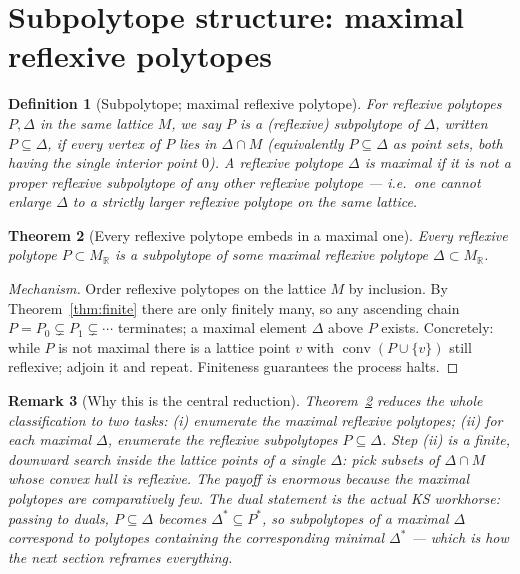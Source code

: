 \documentclass{amsart}
\newtheorem{theorem}{Theorem}[section]
\newtheorem{definition}[theorem]{Definition}
\newtheorem{remark}[theorem]{Remark}
\begin{document}
\section{Subpolytope structure: maximal reflexive polytopes}\label{sec:sub}

\begin{definition}[Subpolytope; maximal reflexive polytope]\label{def:max}
For reflexive polytopes $P,\Delta$ in the \emph{same} lattice $M$, we say
$P$ is a \emph{(reflexive) subpolytope} of $\Delta$, written $P \subseteq
\Delta$, if every vertex of $P$ lies in $\Delta \cap M$ (equivalently
$P \subseteq \Delta$ as point sets, both having the single interior point
$0$). A reflexive polytope $\Delta$ is \emph{maximal} if it is not a proper
reflexive subpolytope of any other reflexive polytope --- i.e.\ one cannot
enlarge $\Delta$ to a strictly larger reflexive polytope on the same lattice.
\end{definition}

\begin{theorem}[Every reflexive polytope embeds in a maximal one]\label{thm:embed}
Every reflexive polytope $P \subset M_{\mathbb{R}}$ is a subpolytope of some
maximal reflexive polytope $\Delta \subset M_{\mathbb{R}}$.
\end{theorem}

\begin{proof}[Mechanism]
Order reflexive polytopes on the lattice $M$ by inclusion. By
Theorem~\ref{thm:finite} there are only finitely many, so any ascending
chain $P = P_0 \subsetneq P_1 \subsetneq \cdots$ terminates; a maximal
element $\Delta$ above $P$ exists. Concretely: while $P$ is not maximal there
is a lattice point $v$ with $\operatorname{conv}(P \cup \{v\})$ still
reflexive; adjoin it and repeat. Finiteness guarantees the process halts.
\end{proof}

\begin{remark}[Why this is the central reduction]
Theorem~\ref{thm:embed} reduces the whole classification to two tasks:
(i) enumerate the \emph{maximal} reflexive polytopes; (ii) for each maximal
$\Delta$, enumerate the reflexive subpolytopes $P \subseteq \Delta$. Step
(ii) is a finite, downward search inside the lattice points of a single
$\Delta$: pick subsets of $\Delta \cap M$ whose convex hull is reflexive.
The payoff is enormous because the maximal polytopes are comparatively
few. The dual statement is the actual KS workhorse: passing to duals,
$P \subseteq \Delta$ becomes $\Delta^* \subseteq P^*$, so subpolytopes of a
maximal $\Delta$ correspond to polytopes \emph{containing} the
corresponding minimal $\Delta^*$ --- which is how the next section reframes
everything.
\end{remark}
\end{document}
